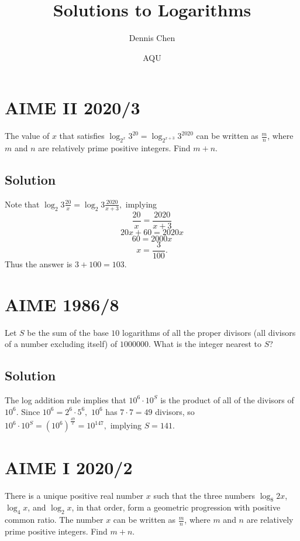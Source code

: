 \documentclass{article}
\title{Solutions to Logarithms}
\author{Dennis Chen}
\date{AQU}
\begin{document}
\maketitle

\toc

\pagebreak\section{AIME II 2020/3}

The value of $x$ that satisfies $\log_{2^x} 3^{20} = \log_{2^{x+3}} 3^{2020}$ can be written as $\frac{m}{n}$, where $m$ and $n$ are relatively prime positive integers. Find $m+n$.

\subsection{Solution}

Note that $\log_2{3}\frac{20}{x}=\log_2{3}\frac{2020}{x+3},$ implying
\[\frac{20}{x}=\frac{2020}{x+3}\]
\[20x+60=2020x\]
\[60=2000x\]
\[x=\frac{3}{100}.\]
Thus the answer is $3+100=103.$

\pagebreak\section{AIME 1986/8}

Let $S$ be the sum of the base $10$ logarithms of all the proper divisors (all divisors of a number excluding itself) of $1000000$. What is the integer nearest to $S$?

\subsection{Solution}

The log addition rule implies that $10^6\cdot 10^S$ is the product of all of the divisors of $10^6.$ Since $10^6=2^6\cdot 5^6,$ $10^6$ has $7\cdot 7=49$ divisors, so $10^6\cdot 10^S=(10^6)^{\frac{49}{2}}=10^{147},$ implying $S=141.$

\pagebreak\section{AIME I 2020/2}

There is a unique positive real number $x$ such that the three numbers $\log_8{2x}$, $\log_4{x}$, and $\log_2{x}$, in that order, form a geometric progression with positive common ratio. The number $x$ can be written as $\frac{m}{n}$, where $m$ and $n$ are relatively prime positive integers. Find $m + n$.
\end{document}

